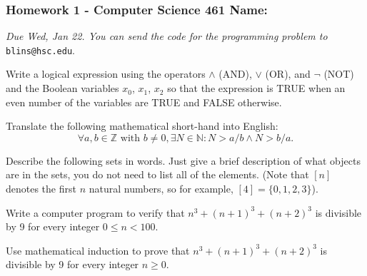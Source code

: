 \documentclass[12pt]{exam}
\newcommand{\Z}{\mathbb{Z}}
\newcommand{\N}{\mathbb{N}}
\begin{document}
\pagestyle{empty}
\subsubsection*{Homework 1 - Computer Science 461 \hfill Name: \underline{\hspace*{2in}}}

\textit{Due Wed, Jan 22. You can send the code for the programming problem to }\verb|blins@hsc.edu|.

\begin{questions}


\question Write a logical expression using the operators $\wedge$ (AND), $\vee$ (OR), and $\neg$ (NOT) and the Boolean variables $x_0$, $x_1$, $x_2$ so that the expression is TRUE when an even number of the variables are TRUE and FALSE otherwise.   
\vfill

\question Translate the following mathematical short-hand into English: 
$$\forall a, b \in \Z \text{ with } b \ne 0, \exists N \in \N: N > a/b \wedge N > b/a.$$
\vfill

\question Describe the following sets in words.  Just give a brief description of what objects are in the sets, you do not need to list all of the elements. (Note that $[n]$ denotes the first $n$ natural numbers, so for example, $[4] = \{0, 1, 2, 3\}$). 

\question Write a computer program to verify that $n^3 + (n+1)^3 + (n+2)^3$ is divisible by 9 for every integer $0 \le n < 100$.  
\vfill

\question Use mathematical induction to prove that $n^3 + (n+1)^3 + (n+2)^3$ is divisible by 9 for every integer $n \ge 0$.  
\vfill


\end{questions}
\end{document}
